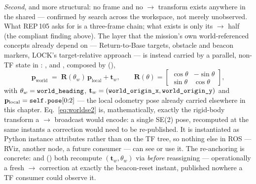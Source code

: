 \emph{Second}, and more structural: no  frame and no
$\to$ transform exists anywhere in the shared
 — confirmed by search across the workspace, not merely
unobserved. What REP\,105 asks for is a three-frame chain; what exists is
only its $\to$ half (the compliant finding
above). The  layer that the mission's own world-referenced
concepts already depend on — Return-to-Base targets, obstacle and beacon
markers, LOCK's target-relative approach — is instead carried by a
parallel, non-TF state in : ,
 and , composed by
 (),
\begin{equation}
\mathbf{p}_{\text{world}} \;=\; \mathbf{R}(\theta_w)\,\mathbf{p}_{\text{local}} + \mathbf{t}_w,
\qquad
\mathbf{R}(\theta) = \begin{bmatrix} \cos\theta & -\sin\theta \\ \sin\theta & \cos\theta \end{bmatrix},
\label{eq:worldse2}
\end{equation}
with $\theta_w = \code{world\_heading}$, $\mathbf{t}_w =
(\code{world\_origin\_x}, \code{world\_origin\_y})$ and
$\mathbf{p}_{\text{local}} = \code{self.pose}[0{:}2]$ — the local odometry
pose already carried elsewhere in this chapter. Eq.~\ref{eq:worldse2} is,
mathematically, exactly the rigid-body transform a
$\to$ broadcast would encode: a single SE(2) pose,
recomputed at the same instants a correction would need to be re-published.
It is instantiated as Python instance attributes rather than on the TF
tree, so nothing else in ROS — RViz, another node, a future
 consumer — can see or use it. The re-anchoring is
concrete:  and 
() both recompute
$(\mathbf{t}_w,\theta_w)$ via  \emph{before}
reassigning  — operationally a fresh
$\to$ correction at exactly the beacon-reset instant,
published nowhere a TF consumer could observe it.

